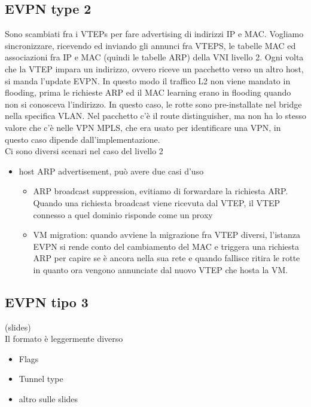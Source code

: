 \documentclass[12pt, oneside]{extbook} %
\begin{document}
\subsection{EVPN type 2}
Sono scambiati fra i VTEPs per fare advertising di indirizzi IP e MAC. Vogliamo sincronizzare, ricevendo ed inviando gli annunci fra VTEPS, le tabelle MAC ed associazioni fra IP e MAC (quindi le tabelle ARP) della VNI livello 2. Ogni volta che la VTEP impara un indirizzo, ovvero riceve un pacchetto verso un altro host, si manda l'update EVPN. In questo modo il traffico L2 non viene mandato in flooding, prima le richieste ARP ed il MAC learning erano in flooding quando non si conosceva l'indirizzo. In questo caso, le rotte sono pre-installate nel bridge nella specifica VLAN. Nel pacchetto c'è il route distinguisher, ma non ha lo stesso valore che c'è nelle VPN MPLS, che era usato per identificare una VPN, in questo caso dipende dall'implementazione.\\Ci sono diversi scenari nel caso del livello 2
\begin{itemize}
\item host ARP advertisement, può avere due casi d'uso
\begin{itemize}
\item ARP broadcast suppression, evitiamo di forwardare la richiesta ARP. Quando una richiesta broadcast viene ricevuta dal VTEP, il VTEP connesso a quel dominio risponde come un proxy
\item VM migration: quando avviene la migrazione fra VTEP diversi, l'istanza EVPN si rende conto del cambiamento del MAC e triggera una richiesta ARP per capire se è ancora nella sua rete e quando fallisce ritira le rotte in quanto ora vengono annunciate dal nuovo VTEP che hosta la VM.
\end{itemize}
\end{itemize}
\subsection{EVPN tipo 3}
(slides)\\Il formato è leggermente diverso
\begin{itemize}
\item Flags
\item Tunnel type
\item altro sulle slides
\end{itemize}
\end{document}
